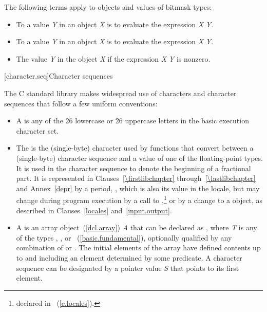 \pnum
The following terms apply to objects and values of
bitmask types:

\begin{itemize}
\item
To
a value \textit{Y} in an object \textit{X}
is to evaluate the expression \textit{X} \tcode{|=} \textit{Y}.
\item
To
a value \textit{Y} in an object
\textit{X} is to evaluate the expression \textit{X} \tcode{\&= \~}\textit{Y}.
\item
The value \textit{Y}
in the object
\textit{X} if the expression \textit{X} \tcode{\&} \textit{Y} is nonzero.
\end{itemize}

[character.seq]{Character sequences}

\pnum
The C standard library makes widespread use
%
of characters and character sequences that follow a few uniform conventions:

\begin{itemize}
\item
A
is any of the 26 lowercase or 26
%
%
uppercase letters in the basic execution character set.
\item
The
is the
%
(single-byte) character used by functions that convert between a (single-byte)
character sequence and a value of one of the floating-point types.
It is used
in the character sequence to denote the beginning of a fractional part.
It is
represented in Clauses~\ref{\firstlibchapter} through~\ref{\lastlibchapter}
and Annex~\ref{depr} by a period,
%
,
which is
also its value in the 
locale, but may change during program
execution by a call to
,\footnote{declared in
~(\ref{c.locales}).
%
%
%
}
or by a change to a
object, as described in Clauses~\ref{locales} and~\ref{input.output}.
\item
A
is an array object~(\ref{dcl.array}) \textit{A} that
can be declared as
,
where \textit{T} is any of the types
,
,
or
~(\ref{basic.fundamental}), optionally qualified by any combination of
or
.
The initial elements of the
array have defined contents up to and including an element determined by some
predicate.
A character sequence can be designated by a pointer value
\textit{S} that points to its first element.
\end{itemize}

